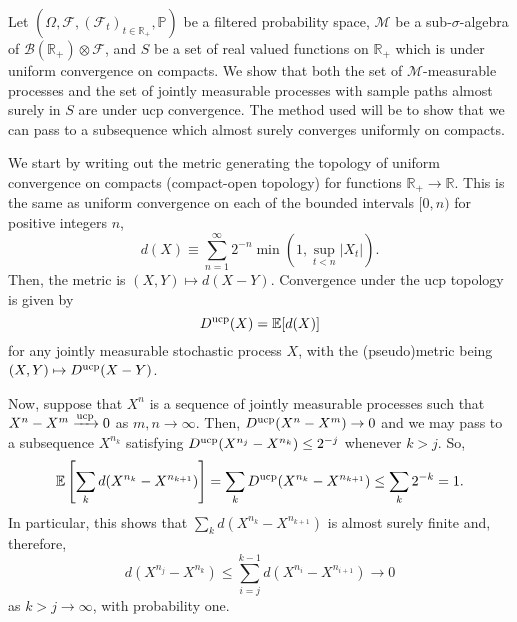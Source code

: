 \documentclass[12pt]{article}
\begin{document}

Let $(\Omega,\mathcal{F},(\mathcal{F}_t)_{t\in\mathbb{R}_+},\mathbb{P})$ be a filtered probability space, $\mathcal{M}$ be a sub-$\sigma$-algebra of $\mathcal{B}(\mathbb{R}_+)\otimes\mathcal{F}$, and $S$ be a set of real valued functions on $\mathbb{R}_+$ which is  under uniform convergence on compacts. We show that both the set of $\mathcal{M}$-measurable processes and the set of jointly measurable processes with sample paths almost surely in $S$ are  under ucp convergence. The method used will be to show that we can pass to a subsequence which almost surely converges uniformly on compacts.

We start by writing out the metric generating the topology of uniform convergence on compacts (compact-open topology) for functions $\mathbb{R}_+\rightarrow\mathbb{R}$. This is the same as uniform convergence on each of the bounded intervals $[0,n)$ for positive integers $n$,
\begin{equation*}
d(X)\equiv\sum_{n=1}^\infty 2^{-n}\min\left(1,\sup_{t<n}|X_t|\right).
\end{equation*}
Then, the metric is $(X,Y)\mapsto d(X-Y)$.  Convergence under the ucp topology is given by
\begin{equation*}
D^{\rm ucp}(X)=\mathbb{E}[d(X)]
\end{equation*}
for any jointly measurable stochastic process $X$, with the (pseudo)metric being $(X,Y)\mapsto D^{\rm ucp}(X-Y)$.

Now, suppose that $X^n$ is a sequence of jointly measurable processes such that $X^n-X^m\xrightarrow{\rm ucp} 0$ as $m,n\rightarrow\infty$. Then, $D^{\rm ucp}(X^n-X^m)\rightarrow 0$ and we may pass to a subsequence $X^{n_k}$ satisfying $D^{\rm ucp}(X^{n_j}-X^{n_k})\le 2^{-j}$ whenever $k>j$. So,
\begin{equation*}
\mathbb{E}\left[\sum_k d(X^{n_k}-X^{n_{k+1}})\right]=\sum_kD^{\rm ucp}(X^{n_k}-X^{n_{k+1}})\le\sum_k2^{-k}=1.
\end{equation*}
In particular, this shows that $\sum_k d(X^{n_{k}}-X^{n_{k+1}})$ is almost surely finite and, therefore,
\begin{equation*}
d(X^{n_j}-X^{n_k})\le \sum_{i=j}^{k-1}d(X^{n_i}-X^{n_{i+1}})\rightarrow 0
\end{equation*}
as $k>j\rightarrow \infty$, with probability one.
\end{document}
